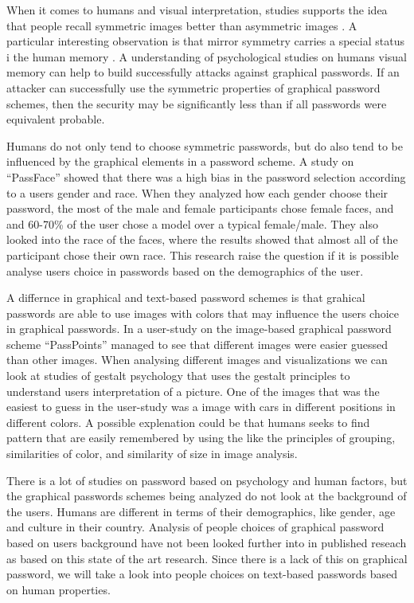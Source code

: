   When it comes to humans and visual interpretation, studies supports the idea that people recall symmetric images better than asymmetric images \cite{Attneave, French}. A particular interesting observation is that mirror symmetry carries a special status i the human memory \cite{Wagemans1}. A understanding of psychological studies on humans visual memory can help to build successfully attacks against graphical passwords. If an attacker can successfully use the symmetric properties of graphical password schemes, then the security may be significantly less than if all passwords were equivalent probable. 

  Humans do not only tend to choose symmetric passwords, but do also tend to be influenced by the graphical elements in a password scheme. A study on ``PassFace'' \cite{Davis} showed that there was a high bias in the password selection according to a users gender and race. When they analyzed how each gender choose their password, the most of the male and female participants chose female faces, and and 60-70\% of the user chose a model over a typical female/male. They also looked into the race of the faces, where the results showed that almost all of the participant chose their own race. This research raise the question if it is possible analyse users choice in passwords based on the demographics of the user.

  A differnce in graphical and text-based password schemes is that grahical passwords are able to use images with colors that may influence the users choice in graphical passwords. In a user-study \cite{Thorpe2} on the image-based graphical password scheme ``PassPoints'' managed to see that different images were easier guessed than other images. When analysing different images and visualizations we can look at studies of gestalt psychology \cite{Wagemans2} that uses the gestalt principles to understand users interpretation of a picture. One of the images that was the easiest to guess in the user-study was a image with cars in different positions in different colors. A possible explenation could be that humans seeks to find pattern that are easily remembered by using the like the principles of grouping, similarities of color, and similarity of size in image analysis.

  There is a lot of studies on password based on psychology and human factors, but the graphical passwords schemes being analyzed do not look at the background of the users. Humans are different in terms of their demographics, like gender, age and culture in their country. Analysis of people choices of graphical password based on users background have not been looked further into in published reseach as based on this state of the art research. Since there is a lack of this on graphical password, we will take a look into people choices on text-based passwords based on human properties. 


